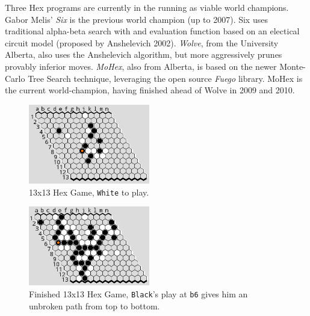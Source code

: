 \documentclass[10pt,a4paper]{report}
\newcommand{\black}{\texttt{Black}}
\newcommand{\white}{\texttt{White}}
\newcommand{\loc}[1]{\texttt{#1}}
\begin{document}
Three Hex programs are currently in the running as viable world champions. Gabor Melis' \emph{Six} is the previous world champion (up to 2007). Six uses traditional alpha-beta search with and evaluation function based on an electical circuit model (proposed by Anshelevich 2002)\cite{anshelevich2002hierarchical}. \emph{Wolve}, from the University Alberta, also uses the Anshelevich algorithm, but more aggressively prunes provably inferior moves. \emph{MoHex}, also from Alberta, is based on the newer Monte-Carlo Tree Search technique, leveraging the open source \emph{Fuego} library. MoHex is the current world-champion, having finished ahead of Wolve in 2009 and 2010.

\begin{figure}
	\begin{center}
	\includegraphics[width=200px]{graphics/13x13-in-progress.png}
	\caption{13x13 Hex Game, \white{} to play.}
	\end{center}
	\label{fig:13x13inprogress}
\end{figure}
\begin{figure}
	\begin{center}
	\includegraphics[width=200px]{graphics/13x13-finished.png}
	\caption{Finished 13x13 Hex Game, \black{}'s play at \loc{b6} gives him an unbroken path from top to bottom.}
	\end{center}
	\label{fig:13x13finished}
\end{figure}
\end{document}
